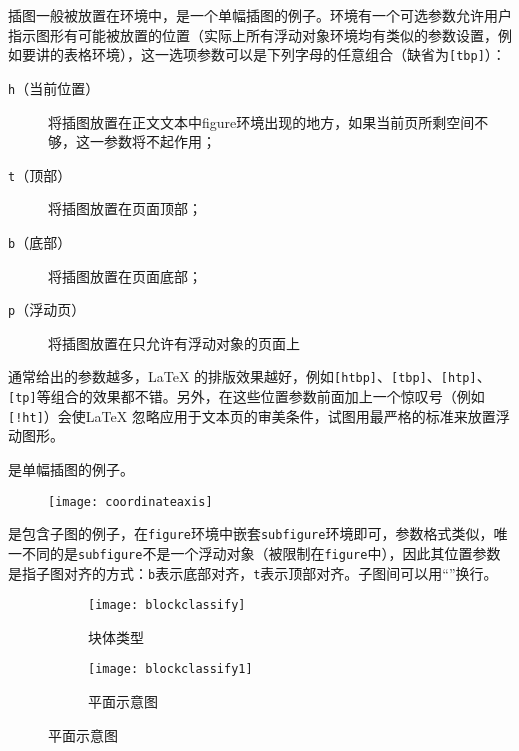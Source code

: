 插图一般被放置在环境中，是一个单幅插图的例子。环境有一个可选参数允许用户指示图形有可能被放置的位置（实际上所有浮动对象环境均有类似的参数设置，例如要讲的表格环境），这一选项参数可以是下列字母的任意组合（缺省为\texttt{[tbp]}）：
\begin{description}
	\item[\texttt{h}（当前位置）] 将插图放置在正文文本中figure环境出现的地方，如果当前页所剩空间不够，这一参数将不起作用；
	\item[\texttt{t}（顶部）] 将插图放置在页面顶部；
	\item[\texttt{b}（底部）] 将插图放置在页面底部；
	\item[\texttt{p}（浮动页）] 将插图放置在只允许有浮动对象的页面上
\end{description}

通常给出的参数越多，\LaTeX{} 的排版效果越好，例如\texttt{[htbp]}、\texttt{[tbp]}、\texttt{[htp]}、\texttt{[tp]}等组合的效果都不错。另外，在这些位置参数前面加上一个惊叹号（例如\texttt{[!ht]}）会使\LaTeX{} 忽略应用于文本页的审美条件，试图用最严格的标准来放置浮动图形。

是单幅插图的例子。

\begin{figure}[htbp]
\centering
\texttt{[image: coordinateaxis]}
\label{fig:samples:coordinateaxis}
\end{figure}

是包含子图的例子，在\texttt{figure}环境中嵌套\texttt{subfigure}环境即可，参数格式类似，唯一不同的是\texttt{subfigure}不是一个浮动对象（被限制在\texttt{figure}中），因此其位置参数是指子图对齐的方式：\texttt{b}表示底部对齐，\texttt{t}表示顶部对齐。子图间可以用“\ltxcmdname{\textbackslash}”换行。

\begin{figure}[htbp]
\def\figwidth{\columnwidth}
  \centering
    \begin{subfigure}[b]{0.5\figwidth} %
      \centering
      \texttt{[image: blockclassify]}
      \caption{块体类型}\label{fig:samples:blockclassify}
    \end{subfigure} %
    \begin{subfigure}[b]{0.36\figwidth}
      \centering
      \texttt{[image: blockclassify1]}
      \caption{平面示意图}\label{fig:samples:blockclassify1}
    \end{subfigure}
  \label{fig:samples:blcfy}
\end{figure}

